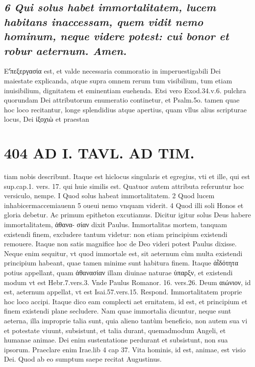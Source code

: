 \documentclass{article}
\begin{document}
\begin{pages}
\subsection*{\textit{6 Qui solus habet immortalitatem, lucem habitans inaccessam, quem vidit nemo hominum, neque videre potest: cui bonor et robur aeternum. Amen. }}\pstart Εʹ̓πεξεργασία est, et valde necessaria commoratio in imperuestigabili Dei maiestate explicanda, atque supra omnem rerum tum visibilium, tum etiam inuisibilium, dignitatem et eminentiam euehenda. Etsi vero Exod.34.v.6. pulchra quorundam Dei attributorum enumeratio continetur, et Psalm.5o. tamen quae hoc loco recitantur, longe splendidius atque apertius, quam vllus alius scripturae locus, Dei ἰξοχιὼ et praestan\pend
\section*{404 AD I. TAVL. AD TIM. }\pstart tiam nobis describunt. Itaque est hiclocus singularis et egregius, vti et ille, qui est sup.cap.1. vers. 17. qui huie similis est. Quatuor autem attributa referuntur hoc versiculo, nempe. I Quod solus habeat immortalitatem. 2 Quod lucem inhabicermaccemiauenn 5 oueui nemo vnquam viderit. 4 Quod illi soli Honos et gloria debetur.  \pend\pstart Ac primum epitheton excutiamus. Dicitur igitur solus Deus habere immortalitatem, ἀθανα- σίαν dixit Paulus. Immortalitas mortem, tanquam existendi finem, excludere tantum videtur: non etiam principium existendi remouere. Itaque non satis magnifice hoc de Deo videri potest Paulus dixisse. Neque enim sequitur, vt quod immortale est, sit aeternum cùm multa existendi principium habeant, quae tamen minime sunt habitura finem. Itaque ἀἶδότητα potius appellant, quam ἀθανασίαν illam diuinae naturae ὐπαρξν, et existendi modum vt est Hebr.7.vers.3. Vnde Paulus Romanor. 16. vers.26. Deum αιώνιον, id est, aeternum appellat, vt est Isai.57.vers.15. Respond. Immortalitatem proprie hoc loco accipi. Itaque dico eam complecti aet ernitatem, id est, et principium et finem existendi plane secludere. Nam quae immortalia dicuntur, neque sunt aeterna, illa improprie talia sunt, quia alieno tantùm beneficio, non autem sua vi et potestate viuunt, subsistunt, et talia durant, quemadmodum Angeli, et humanae animae. Dei enim sustentatione perdurant et subsistunt, non sua ipsorum. Praeclare enim Irae.lib 4 cap 37. Vita hominis, id est, animae, est visio Dei. Quod ab eo sumptum saepe recitat Augustinus.  \pend

\end{pages}
\end{document}
